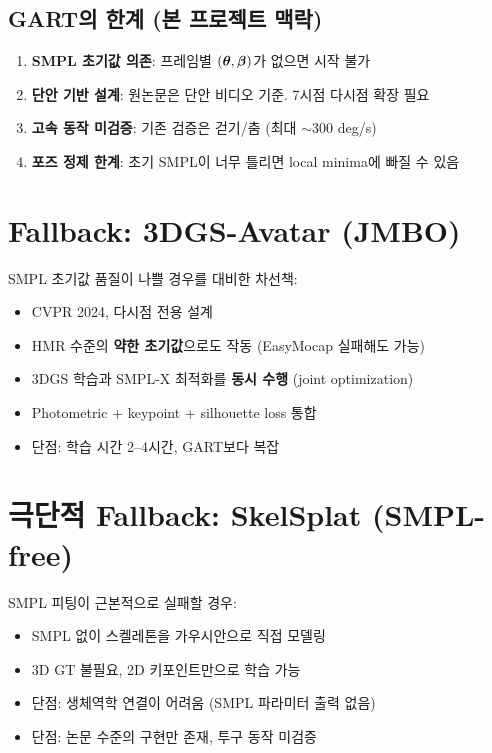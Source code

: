\documentclass[11pt, a4paper]{report}
\begin{document}
\subsection{GART의 한계 (본 프로젝트 맥락)}

\begin{warningbox}
\begin{enumerate}[leftmargin=*]
  \item \textbf{SMPL 초기값 의존}: 프레임별 $(\bm{\theta}, \bm{\beta})$가 없으면 시작 불가
  \item \textbf{단안 기반 설계}: 원논문은 단안 비디오 기준. 7시점 다시점 확장 필요
  \item \textbf{고속 동작 미검증}: 기존 검증은 걷기/춤 (최대 $\sim$300 deg/s)
  \item \textbf{포즈 정제 한계}: 초기 SMPL이 너무 틀리면 local minima에 빠질 수 있음
\end{enumerate}
\end{warningbox}


\section{Fallback: 3DGS-Avatar (JMBO)}

SMPL 초기값 품질이 나쁠 경우를 대비한 차선책:

\begin{biomechbox}[title={3DGS-Avatar with Joint Multi-view Body Optimization}]
\begin{itemize}[leftmargin=*]
  \item CVPR 2024, 다시점 전용 설계
  \item HMR 수준의 \textbf{약한 초기값}으로도 작동 (EasyMocap 실패해도 가능)
  \item 3DGS 학습과 SMPL-X 최적화를 \textbf{동시 수행} (joint optimization)
  \item Photometric + keypoint + silhouette loss 통합
  \item 단점: 학습 시간 2--4시간, GART보다 복잡
\end{itemize}
\end{biomechbox}

\section{극단적 Fallback: SkelSplat (SMPL-free)}

SMPL 피팅이 근본적으로 실패할 경우:

\begin{cvbox}[title={SkelSplat (WACV 2026)}]
\begin{itemize}[leftmargin=*]
  \item SMPL 없이 스켈레톤을 가우시안으로 직접 모델링
  \item 3D GT 불필요, 2D 키포인트만으로 학습 가능
  \item 단점: 생체역학 연결이 어려움 (SMPL 파라미터 출력 없음)
  \item 단점: 논문 수준의 구현만 존재, 투구 동작 미검증
\end{itemize}
\end{cvbox}
\end{document}

